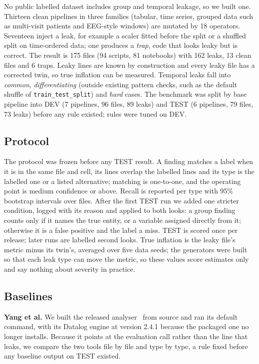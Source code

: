 \documentclass[10pt,a4paper,twocolumn]{article}
\newcommand{\code}[1]{\texttt{#1}}
\begin{document}
No public labelled dataset includes group and temporal leakage, so we built one. Thirteen clean pipelines in three
families (tabular, time series, grouped data such as multi-visit patients and EEG-style windows) are mutated by 18
operators. Seventeen inject a leak, for example a scaler fitted before the split or a shuffled split on
time-ordered data; one produces a \emph{trap}, code that looks leaky but is correct. The result is 175 files (94
scripts, 81 notebooks) with 162 leaks, 13 clean files and 6 traps. Leaky lines are known by construction and
every leaky file has a corrected twin, so true inflation can be measured. Temporal leaks fall into \emph{common},
\emph{differentiating} (outside existing pattern checks, such as the default shuffle of
\code{train\_test\_split}) and \emph{hard} cases. The benchmark was split by base pipeline into DEV (7 pipelines,
96 files, 89 leaks) and TEST (6 pipelines, 79 files, 73 leaks) before any rule existed; rules were tuned on DEV.

\subsection{Protocol}

The protocol was frozen before any TEST result. A finding matches a label when it is in the same file and
cell, its lines overlap the labelled lines and its type is the labelled one or a listed alternative; matching is
one-to-one, and the operating point is medium confidence or above. Recall is reported per type with 95\% bootstrap
intervals over files. After the first TEST run we added one stricter condition, logged with its reason and applied to
both looks: a group finding counts only if it names the true entity, or a variable assigned directly from it;
otherwise it is a false positive and the label a miss. TEST is scored once per release; later runs are labelled
second looks. True inflation is the leaky file's metric minus its twin's, averaged over five data seeds; the
generators were built so that each leak type can move the metric, so these values score estimates only and say
nothing about severity in practice.

\subsection{Baselines}

\textbf{Yang et al.} We built the released analyser~\cite{yang2022} from source and ran its default command, with
its Datalog engine at version 2.4.1 because the packaged one no longer installs. Because it points at the
evaluation call rather than the line that leaks, we compare the two tools file by file and type by type, a rule
fixed before any baseline output on TEST existed.
\end{document}
